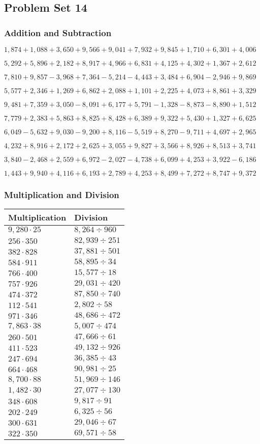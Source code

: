 \hypertarget{problem-set-14-3}{%
\subsection{Problem Set 14}\label{problem-set-14-3}}

\hypertarget{addition-and-subtraction-176}{%
\subsubsection{Addition and
Subtraction}\label{addition-and-subtraction-176}}

\(1,874+1,088+3,650+9,566+9,041+7,932+9,845+1,710+6,301+ 4,006\)

\(5,292+5,896+2,182+8,917+4,966+6,831+4,125+4,302+1,367+2,612\)

\(7,810+9,857-3,968+7,364-5,214-4,443+3,484+6,904-2,946+9,869\)

\(5,577+2,346+1,269+6,862+2,088+1,101+2,225+4,073+8,861+3,329\)

\(9,481+7,359+3,050-8,091+6,177+5,791-1,328-8,873-8,890+1,512\)

\(7,779+2,383+5,863+8,825+8,428+6,389+9,322+5,430+1,327+6,625\)

\(6,049-5,632+9,030-9,200+8,116-5,519+8,270-9,711+4,697+2,965\)

\(4,232+8,916+2,172+2,625+3,055+9,827+3,566+8,926+8,513+3,741\)

\(3,840-2,468+2,559+6,972-2,027-4,738+6,099+4,253+3,922-6,186\)

\(1,443+9,940+4,116+6,193+2,789+4,253+8,499+7,272+8,747+9,372\)

\hypertarget{multiplication-and-division-175}{%
\subsubsection{Multiplication and
Division}\label{multiplication-and-division-175}}

\begin{longtable}[]{@{}ll@{}}
\toprule
Multiplication & Division\tabularnewline
\midrule
\endhead
\(9,280\cdot25\) & \(8,264÷960\)\tabularnewline
\(256\cdot350\) & \(82,939÷251\)\tabularnewline
\(382\cdot828\) & \(37,881÷501\)\tabularnewline
\(584\cdot911\) & \(58,895÷34\)\tabularnewline
\(766\cdot400\) & \(15,577÷18\)\tabularnewline
\(757\cdot926\) & \(29,031÷420\)\tabularnewline
\(474\cdot372\) & \(87,850÷740\)\tabularnewline
\(112\cdot541\) & \(2,802÷58\)\tabularnewline
\(971\cdot346\) & \(48,686÷472\)\tabularnewline
\(7,863\cdot38\) & \(5,007÷474\)\tabularnewline
\(260\cdot501\) & \(47,666÷61\)\tabularnewline
\(411\cdot523\) & \(49,132÷926\)\tabularnewline
\(247\cdot694\) & \(36,385÷43\)\tabularnewline
\(664\cdot468\) & \(90,981÷25\)\tabularnewline
\(8,700\cdot88\) & \(51,969÷146\)\tabularnewline
\(1,482\cdot30\) & \(27,077÷130\)\tabularnewline
\(348\cdot608\) & \(9,817÷91\)\tabularnewline
\(202\cdot249\) & \(6,325÷56\)\tabularnewline
\(300\cdot631\) & \(29,046÷67\)\tabularnewline
\(322\cdot350\) & \(69,571÷58\)\tabularnewline
\bottomrule
\end{longtable}

